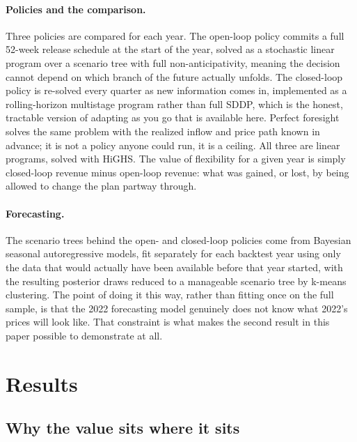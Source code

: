 \documentclass[11pt]{article}
\begin{document}
\paragraph{Policies and the comparison.} Three policies are compared for each year. The open-loop policy commits a full 52-week release schedule at the start of the year, solved as a stochastic linear program over a scenario tree with full non-anticipativity, meaning the decision cannot depend on which branch of the future actually unfolds. The closed-loop policy is re-solved every quarter as new information comes in, implemented as a rolling-horizon multistage program rather than full SDDP, which is the honest, tractable version of adapting as you go that is available here. Perfect foresight solves the same problem with the realized inflow and price path known in advance; it is not a policy anyone could run, it is a ceiling. All three are linear programs, solved with HiGHS. The value of flexibility for a given year is simply closed-loop revenue minus open-loop revenue: what was gained, or lost, by being allowed to change the plan partway through.

\paragraph{Forecasting.} The scenario trees behind the open- and closed-loop policies come from Bayesian seasonal autoregressive models, fit separately for each backtest year using only the data that would actually have been available before that year started, with the resulting posterior draws reduced to a manageable scenario tree by k-means clustering. The point of doing it this way, rather than fitting once on the full sample, is that the 2022 forecasting model genuinely does not know what 2022's prices will look like. That constraint is what makes the second result in this paper possible to demonstrate at all.

\section{Results}

\subsection{Why the value sits where it sits}
\end{document}

